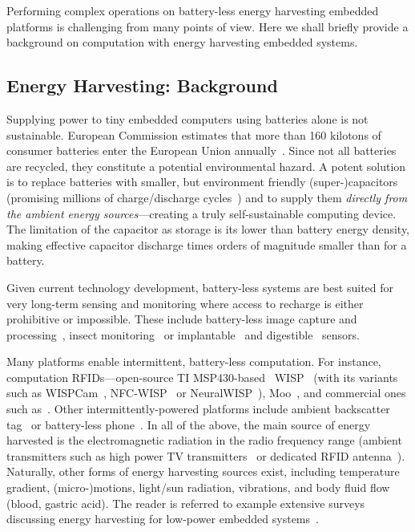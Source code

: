 Performing complex operations on battery-less energy harvesting embedded platforms is challenging from many points of view. Here we shall briefly provide a background on computation with energy harvesting embedded systems. 

\subsection{Energy Harvesting: Background}

Supplying power to tiny embedded computers using batteries alone is not sustainable. European Commission estimates that more than 160 kilotons of consumer batteries enter the European Union annually~\cite{eu_batteries_2016}. Since not all batteries are recycled, they constitute a potential environmental hazard. A potent solution is to replace batteries with smaller, but environment friendly {(super-)capacitors} (promising millions of charge/discharge cycles~\cite[Sec. I]{ongaro_pwre_2012}) and to supply them {\em directly from the ambient energy sources}---creating a truly self-sustainable computing device. The limitation of the capacitor as storage is its lower than battery energy density, making effective capacitor discharge times orders of magnitude smaller than for a battery.

Given current technology development, battery-less systems are best suited for very long-term sensing and monitoring where access to recharge is either prohibitive or impossible. These include battery-less image capture and processing~\cite{naderiparizi_rfid_2015}, insect monitoring~\cite{thomas_jbcs_2012} or implantable~\cite{rodriguez_tbcs_2015}  and digestible~\cite{nadeau_naturebio_2017} sensors.

Many platforms enable intermittent, battery-less computation. For instance, computation RFIDs---open-source TI MSP430-based~\cite{wolverine} WISP~\cite{wisp5} (with its variants such as WISPCam~\cite{naderiparizi_rfid_2015}, NFC-WISP~\cite{zhao_rfid_2015} or NeuralWISP~\cite{holleman_biocas_2008}), Moo~\cite{moo}, and commercial ones such as~\cite{medusa_farsens_2017}. Other intermittently-powered platforms include ambient backscatter tag~\cite{liu_sigcomm_2013,parks_sigcomm_2014} or battery-less phone~\cite{talla_imwut_2017}. In all of the above, the main source of energy harvested is the electromagnetic radiation in the radio frequency range (ambient transmitters such as high power TV transmitters~\cite{liu_sigcomm_2013} or dedicated RFID antenna~\cite{wisp5,moo,talla_imwut_2017,medusa_farsens_2017,holleman_biocas_2008,naderiparizi_rfid_2015}). Naturally, other forms of energy harvesting sources exist, including temperature gradient, (micro-)motions, light/sun radiation, vibrations, and body fluid flow (blood, gastric acid). The reader is referred to example extensive surveys discussing energy harvesting for low-power embedded systems~\cite{paradiso_pvc_2005,soyata_csm_2016,prasad_comst_2014,ku_cst_2016}.

